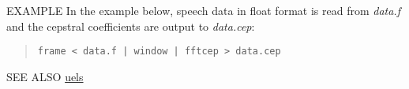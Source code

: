 \begin{options}
\end{options}

\begin{qsection}{EXAMPLE}
In the example below, speech data in float format is read from
{\em data.f} and the cepstral coefficients are output to {\em data.cep}:
\begin{quote}
  \verb!frame < data.f | window | fftcep > data.cep !
\end{quote}
\end{qsection}

\begin{qsection}{SEE ALSO}
\hyperlink{uels}{uels}
\end{qsection}
